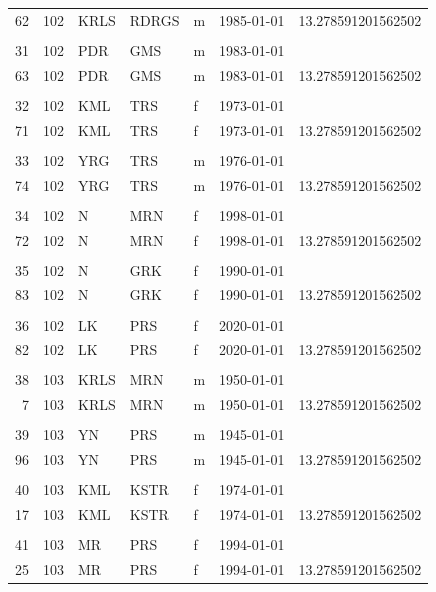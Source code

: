 \documentclass[
  12pt,
]{book}
\begin{document}
\begin{table}[t]
\begin{tabular*}{1\linewidth}{@{\extracolsep{\fill}}rrlllrr}
62 & 102 & KRLS & RDRGS & m & 1985-01-01 & 13.278591201562502 \\ 
 &  &  &  &  &  &  \\ 
31 & 102 & PDR & GMS & m & 1983-01-01 &  \\ 
63 & 102 & PDR & GMS & m & 1983-01-01 & 13.278591201562502 \\ 
 &  &  &  &  &  &  \\ 
32 & 102 & KML & TRS & f & 1973-01-01 &  \\ 
71 & 102 & KML & TRS & f & 1973-01-01 & 13.278591201562502 \\ 
 &  &  &  &  &  &  \\ 
33 & 102 & YRG & TRS & m & 1976-01-01 &  \\ 
74 & 102 & YRG & TRS & m & 1976-01-01 & 13.278591201562502 \\ 
 &  &  &  &  &  &  \\ 
34 & 102 & N & MRN & f & 1998-01-01 &  \\ 
72 & 102 & N & MRN & f & 1998-01-01 & 13.278591201562502 \\ 
 &  &  &  &  &  &  \\ 
35 & 102 & N & GRK & f & 1990-01-01 &  \\ 
83 & 102 & N & GRK & f & 1990-01-01 & 13.278591201562502 \\ 
 &  &  &  &  &  &  \\ 
36 & 102 & LK & PRS & f & 2020-01-01 &  \\ 
82 & 102 & LK & PRS & f & 2020-01-01 & 13.278591201562502 \\ 
 &  &  &  &  &  &  \\ 
38 & 103 & KRLS & MRN & m & 1950-01-01 &  \\ 
 7 & 103 & KRLS & MRN & m & 1950-01-01 & 13.278591201562502 \\ 
 &  &  &  &  &  &  \\ 
39 & 103 & YN & PRS & m & 1945-01-01 &  \\ 
96 & 103 & YN & PRS & m & 1945-01-01 & 13.278591201562502 \\ 
 &  &  &  &  &  &  \\ 
40 & 103 & KML & KSTR & f & 1974-01-01 &  \\ 
17 & 103 & KML & KSTR & f & 1974-01-01 & 13.278591201562502 \\ 
 &  &  &  &  &  &  \\ 
41 & 103 & MR & PRS & f & 1994-01-01 &  \\ 
25 & 103 & MR & PRS & f & 1994-01-01 & 13.278591201562502 \\ 

\end{tabular*}
\end{table}
\end{document}
